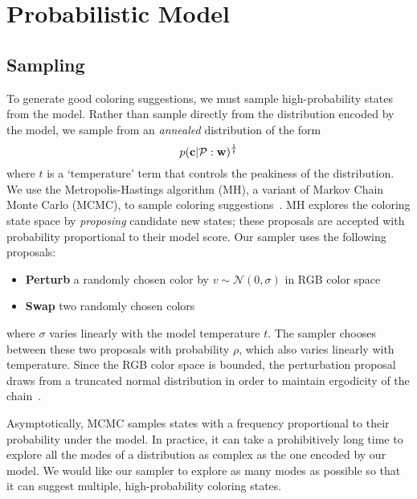 \section{Probabilistic Model}
\label{sec:model}






\subsection{Sampling}
\label{sec:sampling}

To generate good coloring suggestions, we must sample high-probability states from the model. Rather than sample directly from the distribution encoded by the model, we sample from an \emph{annealed} distribution of the form
\begin{equation*}
p(\mathbf{c} | \mathcal{P} : \mathbf{w})^\frac{1}{t}
\end{equation*}
where $t$ is a `temperature' term that controls the peakiness of the distribution.
We use the Metropolis-Hastings algorithm (MH), a variant of Markov Chain Monte Carlo (MCMC), to sample coloring suggestions~\cite{Metropolis,Hastings}. MH explores the coloring state space by \emph{proposing} candidate new states; these proposals are accepted with probability proportional to their model score. Our sampler uses the following proposals:
\begin{itemize}
	\item{\textbf{Perturb} a randomly chosen color by $v \sim \mathcal{N}(0, \sigma)$ in RGB color space}
	\item{\textbf{Swap} two randomly chosen colors}
\end{itemize}
where $\sigma$ varies linearly with the model temperature $t$. The sampler chooses between these two proposals with probability $\rho$, which also varies linearly with temperature. Since the RGB color space is bounded, the perturbation proposal draws from a truncated normal distribution in order to maintain ergodicity of the chain~\cite{TruncatedGaussians}.

Asymptotically, MCMC samples states with a frequency proportional to their probability under the model. In practice, it can take a prohibitively long time to explore all the modes of a distribution as complex as the one encoded by our model. We would like our sampler to explore as many modes as possible so that it can suggest multiple, high-probability coloring states.

